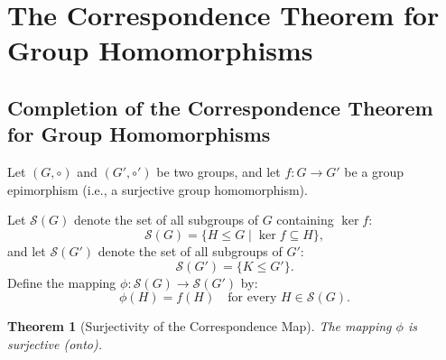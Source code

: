 \documentclass[12pt]{article}
\theoremstyle{definition}
\theoremstyle{plain}
\newtheorem{theorem}{Theorem}[section]
\begin{document}
\section{The Correspondence Theorem for Group Homomorphisms}

\subsection{Completion of the Correspondence Theorem for Group Homomorphisms}

Let $(G, \circ)$ and $(G', \circ')$ be two groups, and let $f: G \to G'$ be a group epimorphism (i.e., a surjective group homomorphism). 

Let $\mathcal{S}(G)$ denote the set of all subgroups of $G$ containing $\ker f$:
\[
\mathcal{S}(G) = \{ H \le G \mid \ker f \subseteq H \},
\]
and let $\mathcal{S}(G')$ denote the set of all subgroups of $G'$:
\[
\mathcal{S}(G') = \{ K \le G' \}.
\]
Define the mapping $\phi: \mathcal{S}(G) \to \mathcal{S}(G')$ by:
\[
\phi(H) = f(H) \quad \text{for every } H \in \mathcal{S}(G).
\]

\begin{theorem}[Surjectivity of the Correspondence Map]
The mapping $\phi$ is surjective (onto).
\end{theorem}
\end{document}
